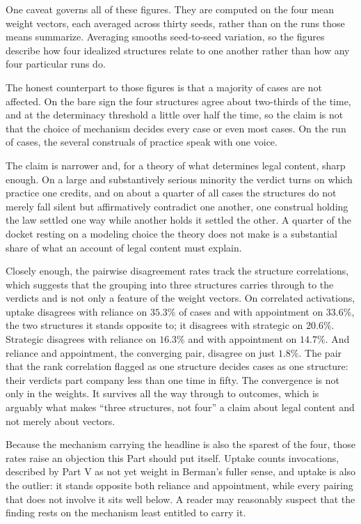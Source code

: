 One caveat governs all of these figures. They are computed on the four mean
weight vectors, each averaged across thirty seeds, rather than on the runs
those means summarize. Averaging smooths seed-to-seed variation, so the
figures describe how four idealized structures relate to one another rather
than how any four particular runs do.

The honest counterpart to those figures is that a majority of cases are not
affected. On the bare sign the four structures agree about two-thirds of the
time, and at the determinacy threshold a little over half the time, so the claim is
not that the choice of mechanism decides every case or even most cases. On the
run of cases, the several construals of practice speak with one voice.

The claim is narrower and, for a theory of what determines legal content,
sharp enough. On a large and substantively serious minority the verdict turns
on which practice one credits, and on about a quarter of all cases the
structures do not merely fall silent but affirmatively contradict one another,
one construal holding the law settled one way while another holds it settled
the other. A quarter of the docket resting on a modeling choice the theory
does not make is a substantial share of what an account of legal content must
explain.

Closely enough, the pairwise disagreement rates track the structure
correlations, which suggests that the grouping into three structures
carries through to the verdicts and is not only a feature of the weight
vectors. On correlated activations,
uptake disagrees with reliance on $35.3\%$ of cases and with appointment
on $33.6\%$, the two structures it stands opposite to; it disagrees with
strategic on $20.6\%$. Strategic disagrees with reliance on $16.3\%$ and
with appointment on $14.7\%$. And reliance and appointment, the
converging pair, disagree on just $1.8\%$. The pair that the rank
correlation flagged as one structure decides cases as one structure:
their verdicts part company less than one time in fifty. The convergence is not only in the weights. It survives all the way through
to outcomes, which is arguably what makes ``three structures, not four'' a
claim about legal content and not merely about vectors.

Because the mechanism carrying the headline is also the sparest of the four,
those rates raise an objection this Part should put itself. Uptake counts invocations, described by Part V as not yet weight in
Berman's fuller sense, and uptake is also the outlier: it
stands opposite both reliance and appointment, while every pairing that
does not involve it sits well below. A reader may reasonably suspect that
the finding rests on the mechanism least entitled to carry it.

